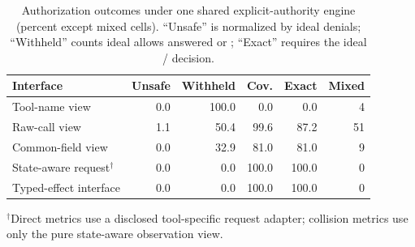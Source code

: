 \begin{table}[t]
\centering
\scriptsize
\setlength{\tabcolsep}{3pt}
\caption{Authorization outcomes under one shared explicit-authority engine
(percent except mixed cells). ``Unsafe'' is normalized by ideal denials;
``Withheld'' counts ideal allows answered \Deny{} or \Abstain{}; ``Exact''
requires the ideal \Allow{}/\Deny{} decision.}
\label{tab:protocol-separated-authorization}
\begin{tabular}{lrrrrr}
\toprule
Interface & Unsafe & Withheld & Cov. & Exact & Mixed \\
\midrule
Tool-name view & 0.0 & 100.0 & 0.0 & 0.0 & 4 \\
Raw-call view & 1.1 & 50.4 & 99.6 & 87.2 & 51 \\
Common-field view & 0.0 & 32.9 & 81.0 & 81.0 & 9 \\
State-aware request$^\dagger$ & 0.0 & 0.0 & 100.0 & 100.0 & 0 \\
Typed-effect interface & 0.0 & 0.0 & 100.0 & 100.0 & 0 \\
\bottomrule
\end{tabular}
\vspace{1pt}\parbox{.98\columnwidth}{\tiny $^\dagger$Direct metrics use a
disclosed tool-specific request adapter; collision metrics use only the pure
state-aware observation view.}
\end{table}
